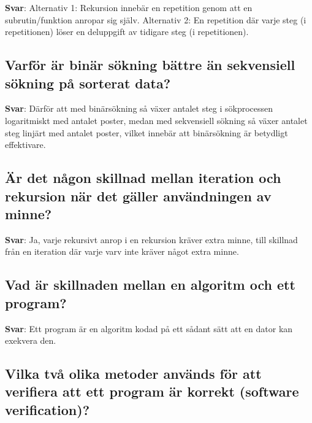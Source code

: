 \documentclass[a4paper,11pt,oneside]{article}
\begin{document}
\begin{sloppypar}
\label{q:173:sa:sv:True}

\textbf{Svar}: Alternativ 1: Rekursion inneb\"ar en repetition genom att en subrutin/funktion anropar sig sj\"alv. Alternativ 2: En repetition d\"ar varje steg (i repetitionen) l\"oser en deluppgift av tidigare steg (i repetitionen).



\subsection{Varf\"or \"ar bin\"ar s\"okning b\"attre \"an sekvensiell s\"okning p\r{a} sorterat data?}

\label{q:174:sa:sv:True}

\textbf{Svar}: D\"arf\"or att med bin\"ars\"okning s\r{a} v\"axer antalet steg i s\"okprocessen logaritmiskt med antalet poster, medan med sekvensiell s\"okning s\r{a} v\"axer antalet steg linj\"art med antalet poster, vilket inneb\"ar att bin\"ars\"okning \"ar betydligt effektivare.



\subsection{\"A\ensuremath{\ddot{}}r det n\r{a}gon skillnad mellan iteration och rekursion n\"ar det g\"aller anv\"andningen av minne?}

\label{q:175:sa:sv:True}

\textbf{Svar}: Ja, varje rekursivt anrop i en rekursion kr\"aver extra minne, till skillnad fr\r{a}n en iteration d\"ar varje varv inte kr\"aver n\r{a}got extra minne.



\subsection{Vad \"ar skillnaden mellan en algoritm och ett program?}

\label{q:177:sa:sv:True}

\textbf{Svar}: Ett program \"ar en algoritm kodad p\r{a} ett s\r{a}dant s\"att att en dator kan exekvera den.



\subsection{Vilka tv\r{a} olika metoder anv\"ands f\"or att verifiera att ett program \"ar korrekt (software verification)?}


\end{sloppypar}
\end{document}
